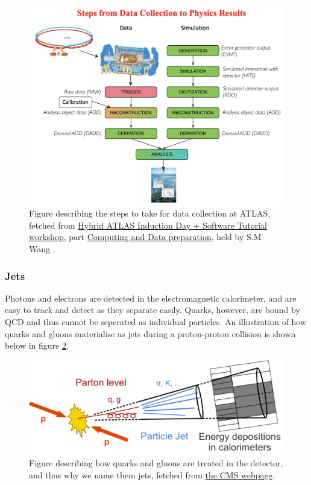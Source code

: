 \begin{figure}[h!]
    \includegraphics[width=\linewidth]{Figures/atlas/data_col_phys.png}
    \caption[Steps from data collection to physics results]{Figure describing the steps to take for data collection at ATLAS, fetched from \href{https://indico.cern.ch/event/1159574/timetable/?view=standard}{Hybrid ATLAS Induction Day + Software Tutorial workshop}, part
    \href{https://indico.cern.ch/event/860971/contributions/3672974/attachments/1972049/3280896/Atlas_computing_data_preparation_jan20.pdf}{Computing and Data preparation}, 
    held by S.M Wang \cite{Wang:2707056} . }
    \label{fig:atlas_data_col_phys}
\end{figure}


\subsubsection*{Jets}
Photons and electrons are detected in the electromagnetic calorimeter, and are easy to track and detect as they 
separate easily. Quarks, however, are bound by QCD and thus cannot be seperated as individual 
particles. An illustration of how quarks and gluons materialise as jets during a proton-proton 
collision is shown below in figure \ref{fig:cms_jets}.

\begin{figure}[h!]
    \includegraphics[width=\linewidth]{Figures/atlas/cms_Sketch_PartonParticleCaloJet.png}
    \caption[Jet produciton from pp-collisions to detector]{Figure describing how quarks and gluons are treated in the detector, and thus why we name them jets, fetched from \href{https://cms.cern/sites/default/files/field/image/Sketch_PartonParticleCaloJet.png}{the CMS webpage}. }
    \label{fig:cms_jets}
\end{figure}

